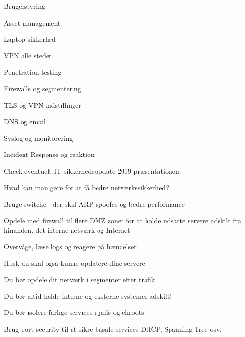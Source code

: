 \documentclass[Screen16to9,17pt]{foils}
\begin{document}
\begin{list2}
\item Brugerstyring
\item Asset management
\item Laptop sikkerhed
\item VPN alle steder
\item Penetration testing
\item Firewalls og segmentering
\item TLS og VPN indstillinger
\item DNS og email
\item Syslog og monitorering
\item Incident Response og reaktion
\end{list2}

Check eventuelt IT sikkerhedsupdate 2019 præsentationen:\\
{\small{}}


\begin{list1}
\item Hvad kan man gøre for at få bedre netværkssikkerhed?
\begin{list2}
\item Bruge switche - der skal ARP spoofes og bedre performance
\item Opdele med firewall til flere DMZ zoner for at holde
      udsatte servere adskilt fra hinanden, det interne netværk og
      Internet
\item Overvåge, læse logs og reagere på hændelser
\end{list2}
\item Husk du skal også kunne opdatere dine servere
\end{list1}



\begin{list1}
\item Du bør opdele dit netværk i segmenter efter trafik
\item Du bør altid holde interne og eksterne systemer adskilt!
\item Du bør isolere farlige services i jails og chroots
\item Brug port security til at sikre basale services DHCP, Spanning Tree osv.
\end{list1}
\end{document}
